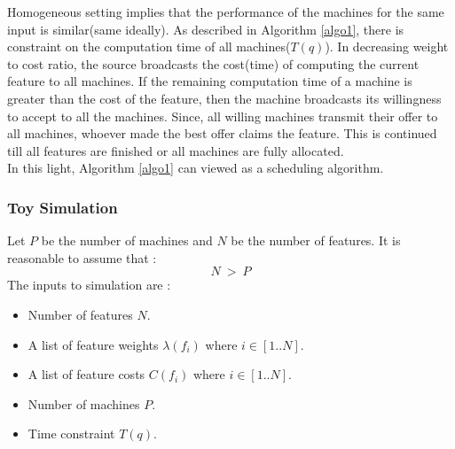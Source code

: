\documentclass[10pt, conference, compsocconf]{IEEEtran}
\begin{document}
Homogeneous setting implies that the performance of the machines for the same input is similar(same ideally). As described in Algorithm \ref{algo1}, there is constraint on the computation time of all machines($T(q)$). In decreasing weight to cost ratio, the source broadcasts the cost(time) of computing the current feature to all machines. If the remaining computation time of a machine is greater than the cost of the feature, then the machine broadcasts its willingness to accept to all the machines. Since, all willing machines transmit their offer to all machines, whoever made the best offer claims the feature. This is continued till all features are finished or all machines are fully allocated. \\
In this light, Algorithm \ref{algo1} can viewed as a scheduling algorithm. \\
\subsubsection{Toy Simulation}
Let $P$ be the number of machines and $N$ be the number of features. It is reasonable to assume that :
$$ N\ >\ P$$
The inputs to simulation are :
\begin {itemize}
\item Number of features $N$.
\item A list of feature weights $\lambda(f_i)$ where $i \in [1..N]$. 
\item A list of feature costs $C(f_i)$ where $i \in [1..N]$.
\item Number of machines $P$.
\item Time constraint $T(q)$.
\end{itemize}
\end{document}
